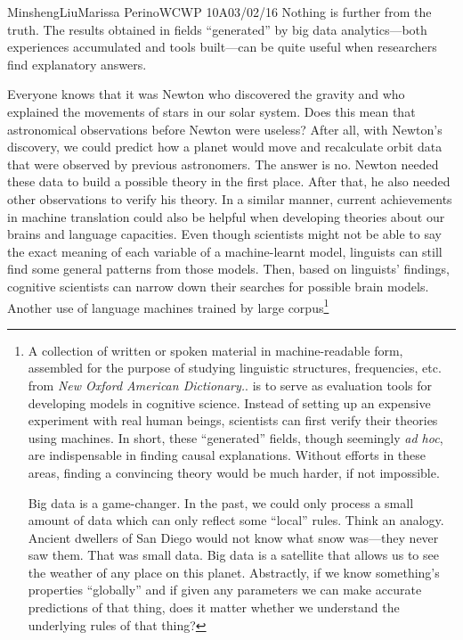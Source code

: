 \documentclass[12pt,letterpaper]{article}
\begin{document}
\begin{mla}{Minsheng}{Liu}{Marissa Perino}{WCWP 10A}{03/02/16}
Nothing is further from the truth. The results obtained in fields
``generated'' by big data analytics---both experiences accumulated and
tools built---can be quite useful when researchers find explanatory
answers.

Everyone knows that it was Newton who discovered the gravity and who
explained the movements of stars in our solar system. Does this mean
that astronomical observations before Newton were useless? After all,
with Newton's discovery, we could predict how a planet would move and
recalculate orbit data that were observed by previous astronomers. The
answer is no. Newton needed these data to build a possible theory in the
first place. After that, he also needed other observations to verify his
theory. In a similar manner, current achievements in machine translation
could also be helpful when developing theories about our brains and
language capacities. Even though scientists might not be able to say the
exact meaning of each variable of a machine-learnt model, linguists can
still find some general patterns from those models. Then, based on
linguists' findings, cognitive scientists can narrow down their searches
for possible brain models. Another use of language machines trained by
large corpus\footnote{A collection of written or spoken material in
machine-readable form, assembled for the purpose of studying linguistic
structures, frequencies, etc. from \textit{New Oxford American Dictionary.}. is to
serve as evaluation tools for developing models in cognitive science.
Instead of setting up an expensive experiment with real human beings,
scientists can first verify their theories using machines. In short,
these ``generated'' fields, though seemingly \emph{ad hoc}, are
indispensable in finding causal explanations. Without efforts in these
areas, finding a convincing theory would be much harder, if not
impossible.

Big data is a game-changer. In the past, we could only process a small
amount of data which can only reflect some ``local'' rules. Think an
analogy. Ancient dwellers of San Diego would not know what snow
was---they never saw them. That was small data. Big data is a satellite
that allows us to see the weather of any place on this planet.
Abstractly, if we know something's properties ``globally'' and if given
any parameters we can make accurate predictions of that thing, does it
matter whether we understand the underlying rules of that thing?

}
\end{mla}
\end{document}
